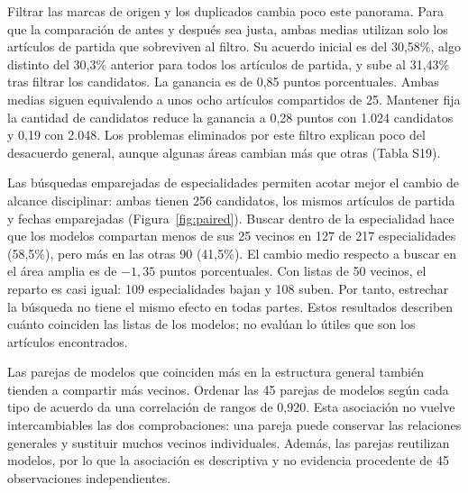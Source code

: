 \documentclass[12pt]{article}
\begin{document}
Filtrar las marcas de origen y los duplicados cambia poco este panorama. Para que la comparación de antes y después sea justa, ambas medias utilizan solo los artículos de partida que sobreviven al filtro. Su acuerdo inicial es del 30,58\%, algo distinto del 30,3\% anterior para todos los artículos de partida, y sube al 31,43\% tras filtrar los candidatos. La ganancia es de 0,85 puntos porcentuales. Ambas medias siguen equivalendo a unos ocho artículos compartidos de 25. Mantener fija la cantidad de candidatos reduce la ganancia a 0,28 puntos con 1.024 candidatos y 0,19 con 2.048. Los problemas eliminados por este filtro explican poco del desacuerdo general, aunque algunas áreas cambian más que otras (Tabla S19).

Las búsquedas emparejadas de especialidades permiten acotar mejor el cambio de alcance disciplinar: ambas tienen 256 candidatos, los mismos artículos de partida y fechas emparejadas (Figura~\ref{fig:paired}). Buscar dentro de la especialidad hace que los modelos compartan menos de sus 25 vecinos en 127 de 217 especialidades (58,5\%), pero más en las otras 90 (41,5\%). El cambio medio respecto a buscar en el área amplia es de $-1,35$ puntos porcentuales. Con listas de 50 vecinos, el reparto es casi igual: 109 especialidades bajan y 108 suben. Por tanto, estrechar la búsqueda no tiene el mismo efecto en todas partes. Estos resultados describen cuánto coinciden las listas de los modelos; no evalúan lo útiles que son los artículos encontrados.

Las parejas de modelos que coinciden más en la estructura general también tienden a compartir más vecinos. Ordenar las 45 parejas de modelos según cada tipo de acuerdo da una correlación de rangos de 0,920. Esta asociación no vuelve intercambiables las dos comprobaciones: una pareja puede conservar las relaciones generales y sustituir muchos vecinos individuales. Además, las parejas reutilizan modelos, por lo que la asociación es descriptiva y no evidencia procedente de 45 observaciones independientes.
\end{document}
